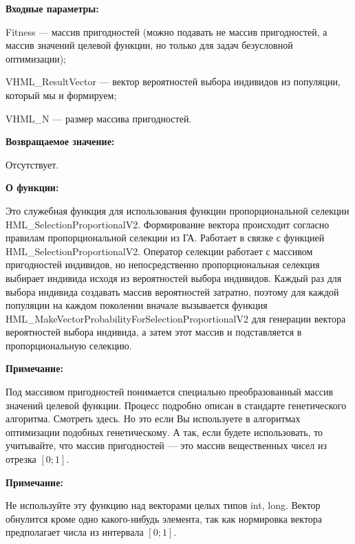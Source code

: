 \textbf{Входные параметры:}
 
Fitness --- массив пригодностей (можно подавать не массив пригодностей, а массив значений целевой функции, но только для задач безусловной оптимизации);
 
VHML\_ResultVector --- вектор вероятностей выбора индивидов из популяции, который мы и формируем;
 
VHML\_N --- размер массива пригодностей.

\textbf{Возвращаемое значение:} 

Отсутствует.

\textbf{О функции:}

 Это служебная функция для использования функции пропорциональной селекции HML\_SelectionProportionalV2.
Формирование вектора происходит согласно правилам пропорциональной селекции из ГА.
Работает в связке с функцией HML\_SelectionProportionalV2. Оператор селекции работает с массивом пригодностей индивидов, но непосредственно пропорциональная селекция выбирает индивида исходя из вероятностей выбора индивидов. Каждый раз для выбора индивида создавать массив вероятностей затратно, поэтому для каждой популяции на каждом поколении вначале вызывается функция HML\_MakeVectorProbabilityForSelectionProportionalV2 для генерации вектора вероятностей выбора индивида, а затем этот массив и подставляется в пропорциональную селекцию.

\textbf{Примечание:}

 Под массивом пригодностей понимается специально преобразованный массив значений целевой функции. Процесс подробно описан в стандарте генетического алгоритма. Смотреть здесь. Но это если Вы используете в алгоритмах оптимизации подобных генетическому. А так, если будете использовать, то учитывайте, что массив пригодностей --- это массив вещественных чисел из отрезка $[0;1]$.
 
 \textbf{Примечание:} 

Не используйте эту функцию над векторами целых типов int, long. Вектор обнулится кроме одно какого-нибудь элемента, так как нормировка вектора предполагает числа из интервала $[0;1]$.